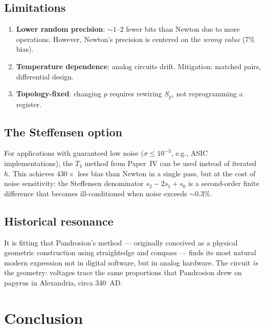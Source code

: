 \documentclass[11pt,a4paper]{article}
\theoremstyle{definition}
\begin{document}
\subsection{Limitations}

\begin{enumerate}
  \item \textbf{Lower random precision}: $\sim 1$--$2$ fewer bits than Newton due to more operations.  However, Newton's precision is centered on the \emph{wrong value} (7\% bias).
  \item \textbf{Temperature dependence}: analog circuits drift.  Mitigation: matched pairs, differential design.
  \item \textbf{Topology-fixed}: changing $p$ requires rewiring $S_p$, not reprogramming a register.
\end{enumerate}

\subsection{The Steffensen option}

For applications with guaranteed low noise ($\sigma \leq 10^{-3}$, e.g., ASIC implementations), the $T_4$ method from Paper~IV can be used instead of iterated $h$.  This achieves $430\times$ less bias than Newton in a single pass, but at the cost of noise sensitivity: the Steffensen denominator $s_2 - 2s_1 + s_0$ is a second-order finite difference that becomes ill-conditioned when noise exceeds $\sim 0.3\%$.

\subsection{Historical resonance}

It is fitting that Pandrosion's method --- originally conceived as a physical geometric construction using straightedge and compass --- finds its most natural modern expression not in digital software, but in analog hardware.  The circuit \emph{is} the geometry: voltages trace the same proportions that Pandrosion drew on papyrus in Alexandria, circa 340~AD.

\section{Conclusion}
\label{sec:conclusion}
\end{document}
